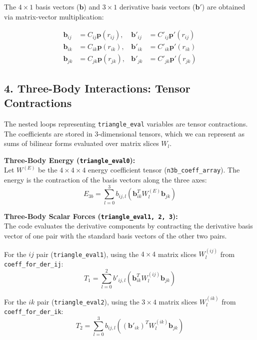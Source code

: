 \documentclass[12pt]{article}
\begin{document}
The $4 \times 1$ basis vectors ($\mathbf{b}$) and $3 \times 1$ derivative basis vectors ($\mathbf{b}'$) are obtained via matrix-vector multiplication:

\begin{align}
\mathbf{b}_{ij} &= C_{ij} \mathbf{p}(r_{ij}), & \mathbf{b}'_{ij} &= C'_{ij} \mathbf{p}'(r_{ij}) \\
\mathbf{b}_{ik} &= C_{ik} \mathbf{p}(r_{ik}), & \mathbf{b}'_{ik} &= C'_{ik} \mathbf{p}'(r_{ik}) \\
\mathbf{b}_{jk} &= C_{jk} \mathbf{p}(r_{jk}), & \mathbf{b}'_{jk} &= C'_{jk} \mathbf{p}'(r_{jk})
\end{align}

\subsection*{4. Three-Body Interactions: Tensor Contractions}
The nested loops representing \texttt{triangle\_eval} variables are tensor contractions. The coefficients are stored in 3-dimensional tensors, which we can represent as sums of bilinear forms evaluated over matrix slices $W_l$.

\textbf{Three-Body Energy (\texttt{triangle\_eval0}):} \\
Let $W^{(E)}$ be the $4 \times 4 \times 4$ energy coefficient tensor (\texttt{n3b\_coeff\_array}). The energy is the contraction of the basis vectors along the three axes:
\begin{equation}
E_{3b} = \sum_{l=0}^{3} b_{ij, l} \left( \mathbf{b}_{ik}^T W^{(E)}_{l} \mathbf{b}_{jk} \right)
\end{equation}

\textbf{Three-Body Scalar Forces (\texttt{triangle\_eval1, 2, 3}):} \\
The code evaluates the derivative components by contracting the derivative basis vector of one pair with the standard basis vectors of the other two pairs.

For the $ij$ pair (\texttt{triangle\_eval1}), using the $4 \times 4$ matrix slices $W^{(ij)}_l$ from \texttt{coeff\_for\_der\_ij}:
\begin{equation}
T_1 = \sum_{l=0}^{2} b'_{ij, l} \left( \mathbf{b}_{ik}^T W^{(ij)}_{l} \mathbf{b}_{jk} \right)
\end{equation}

For the $ik$ pair (\texttt{triangle\_eval2}), using the $3 \times 4$ matrix slices $W^{(ik)}_l$ from \texttt{coeff\_for\_der\_ik}:
\begin{equation}
T_2 = \sum_{l=0}^{3} b_{ij, l} \left( (\mathbf{b}'_{ik})^T W^{(ik)}_{l} \mathbf{b}_{jk} \right)
\end{equation}
\end{document}
